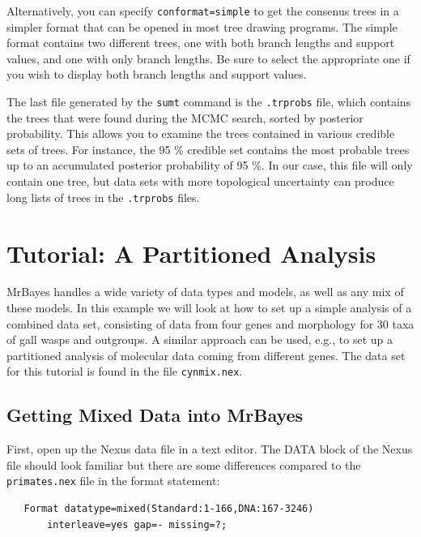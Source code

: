\documentclass[12pt]{book}
\begin{document}
Alternatively, you can specify \texttt{conformat=simple} to get the consenus trees in a simpler format that 
can be opened in most tree drawing programs. The simple format contains two different trees, one with both 
branch lengths and support values, and one with only branch lengths. Be sure to select the appropriate one 
if you wish to display both branch lengths and support values.

The last file generated by the \texttt{sumt} command is the \texttt{.trprobs} file, which contains the trees 
that were found during the MCMC search, sorted by posterior probability. This allows you to examine the 
trees contained in various credible sets of trees. For instance, the 95 \% credible set contains the most 
probable trees up to an accumulated posterior probability of 95 \%. In our case, this file will only contain 
one tree, but data sets with more topological uncertainty can produce long lists of trees in the 
\texttt{.trprobs} files.

\chapter{Tutorial: A Partitioned Analysis}
\label{tutorialPartitioned}
MrBayes handles a wide variety of data types and models, as well as any mix of these models. In this example 
we will look at how to set up a simple analysis of a combined data set, consisting of data from four genes 
and morphology for 30 taxa of gall wasps and outgroups. A similar approach can be used, e.g., to set up a 
partitioned analysis of molecular data coming from different genes. The data set for this tutorial is found 
in the file \texttt{cynmix.nex}.

\section{Getting Mixed Data into MrBayes}

First, open up the Nexus data file in a text editor. The DATA block of the Nexus file should look familiar 
but there are some differences compared to the \texttt{primates.nex} file in the format statement:

\begin{singlespacing}
\small
\begin{verbatim}
   Format datatype=mixed(Standard:1-166,DNA:167-3246)
       interleave=yes gap=- missing=?;
\end{verbatim}
\normalsize
\end{singlespacing}
\end{document}
